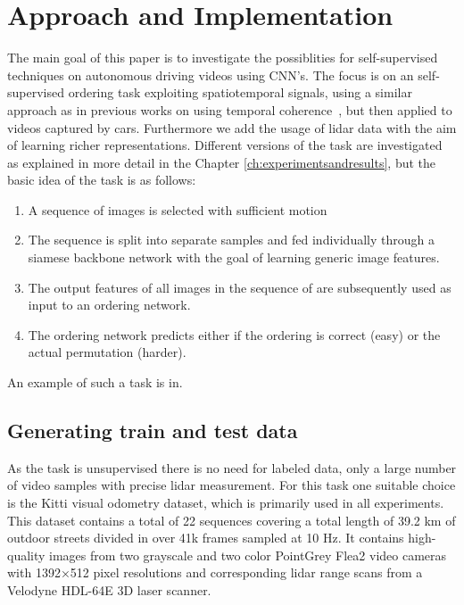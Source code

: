 %
\newpage
\chapter{Approach and Implementation}
\label{ch:implementationdetails}
The main goal of this paper is to investigate the possiblities for self-supervised techniques on autonomous driving videos using CNN's. The focus is on an self-supervised ordering task exploiting spatiotemporal signals, using a similar approach as in previous works on using temporal coherence~\cite{misra2016,lee2017}, but then applied to videos captured by cars. Furthermore we add the usage of lidar data with the aim of learning richer representations. Different versions of the task are investigated as explained in more detail in the  Chapter \ref{ch:experimentsandresults}, but the basic idea of the task is as follows:
\begin{enumerate}    
\item A sequence of images is selected with sufficient motion
\item The sequence is split into separate samples and fed individually through a siamese backbone network with the goal of learning generic image features.
\item The output features of all images in the sequence of are subsequently used as input to an ordering network.
\item The ordering network predicts either if the ordering is correct (easy)\cite{misra2016} or the actual permutation (harder)\cite{lee2017}.
\end{enumerate}
An example of such a task is in\needfig.

\section{Generating train and test data}
As the task is unsupervised there is no need for labeled data, only a large number of video samples with precise lidar measurement. For this task one suitable choice is the Kitti\cite{geiger2012} visual odometry dataset, which is primarily used in all experiments. This dataset contains a total of 22 sequences covering a total length of 39.2 km of outdoor streets divided in over 41k frames sampled at 10 Hz. It contains high-quality images from two grayscale and two color PointGrey Flea2 video cameras with 1392×512 pixel resolutions and corresponding lidar range scans from a Velodyne HDL-64E 3D laser scanner.

